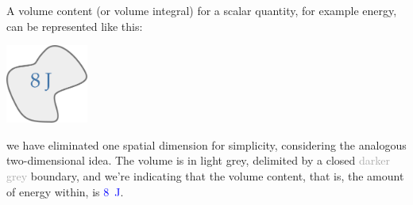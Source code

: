 \documentclass[a4paper,12pt,%
onecolumn,oneside,%
british%
]{memoir}
\renewcommand*{\|}[1][]{\nonscript\:#1\vert\nonscript\:\mathopen{}}
\begin{document}
A volume content (or volume integral) for a scalar quantity, for example energy, can be represented like this:
\begin{center}
  \includegraphics[align=t,height=7em]{images/volumeintegral_8J.pdf}
\end{center}
we have eliminated one spatial dimension for simplicity, considering the analogous two-dimensional idea. The volume is in \textcolor{midgrey}{light grey}, delimited by a closed \textcolor{darkgrey}{darker grey} boundary, and we're indicating that the volume content, that is, the amount of energy within, is \textcolor{blue}{\qty{8}{J}}.
\end{document}
